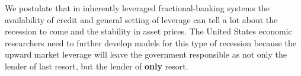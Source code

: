 We postulate that in inherently leveraged fractional-banking systems the availability of credit and general setting of leverage can tell a lot about the recession to come and the stability in asset prices.  The United States economic researchers need to further develop models for this type of recession because the upward market leverage will leave the government responsible as not only the lender of last resort, but the lender of \textbf{only} resort.  



